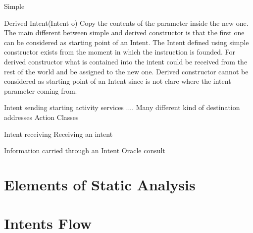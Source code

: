 Simple



Derived
Intent(Intent o) Copy the contents of the parameter inside the new one.
The main different between simple and derived constructor is that the first one can be considered as starting point of an Intent. The Intent defined using simple constructor exists from the moment in which the instruction is founded. For derived constructor what is contained into the intent could be received from the rest of the world and be assigned to the new one. Derived constructor cannot be considered as starting point of an Intent since is not clare where the intent parameter coming from.

Intent sending 
starting activity services ....
Many different kind of destination addresses
Action
Classes

Intent receiving
Receiving an intent

Information carried through an Intent
Oracle consult
\section{Elements of Static Analysis}
\section{Intents Flow}